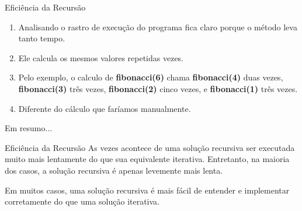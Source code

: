 \begin{frame}{Eficiência da Recursão}
\begin{enumerate}
	\item Analisando o rastro de execução do programa fica claro porque o método leva tanto tempo. 
	\item Ele calcula os mesmos valores repetidas vezes.
	\item Pelo exemplo, o calculo de \textbf{fibonacci(6)} chama \textbf{fibonacci(4)} duas vezes, \textbf{fibonacci(3)} três vezes, \textbf{fibonacci(2)} cinco vezes, e \textbf{fibonacci(1)} três vezes. 
	\item Diferente do cálculo que faríamos manualmente.
\end{enumerate}

\end{frame}

\begin{frame}{Em resumo...}
\begin{block}{Eficiência da Recursão}
As vezes acontece de uma solução recursiva ser executada muito mais lentamente do que sua equivalente iterativa. Entretanto, na maioria dos casos, a solução recursiva é apenas levemente mais lenta.
\end{block}
\begin{block}{}
Em muitos casos, uma solução recursiva é mais fácil de entender e implementar corretamente do que uma solução iterativa.
\end{block}
\end{frame}
